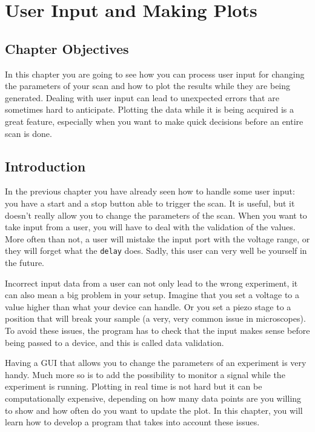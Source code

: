 \chapter{User Input and Making Plots}\label{user-input-and-makingplots}

\section{Chapter Objectives}\label{chapterobjectives}
In this chapter you are going to see how you can process user input for
changing the parameters of your scan and how to plot the results while
they are being generated. Dealing with user input can lead to unexpected
errors that are sometimes hard to anticipate. Plotting the data while it
is being acquired is a great feature, especially when you want to make
quick decisions before an entire scan is done.

\section{Introduction}\label{introduction}
In the previous chapter you have already seen how to handle some user
input: you have a start and a stop button able to trigger the scan. It
is useful, but it doesn't really allow you to change the parameters of
the scan. When you want to take input from a user, you will have to deal
with the validation of the values. More often than not, a user will
mistake the input port with the voltage range, or they will forget what
the \texttt{delay} does. Sadly, this user can very well be yourself in
the future.

Incorrect input data from a user can not only lead to the wrong
experiment, it can also mean a big problem in your setup. Imagine that
you set a voltage to a value higher than what your device can handle. Or
you set a piezo stage to a position that will break your sample (a very,
very common issue in microscopes). To avoid these issues, the program
has to check that the input makes sense before being passed to a device,
and this is called data validation.

Having a {GUI} that allows you to change the parameters of an experiment
is very handy. Much more so is to add the possibility to monitor a
signal while the experiment is running. Plotting in real time is not
hard but it can be computationally expensive, depending on how many data
points are you willing to show and how often do you want to update the
plot. In this chapter, you will learn how to develop a program that
takes into account these issues.

